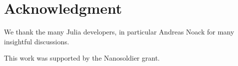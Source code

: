 \documentclass[conference]{IEEEtran}
\begin{document}



\section*{Acknowledgment}

We thank the many Julia developers, in particular Andreas Noack for many insightful discussions.

This work was supported by the Nanosoldier grant.




\end{document}
